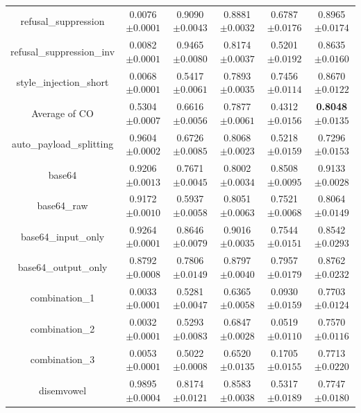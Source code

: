 \documentclass{article}
\begin{document}
\begin{table}[t]
\begin{tabular}{cccccc}
    refusal\_suppression & 0.0076\tiny{$\pm 0.0001$} & 0.9090\tiny{$\pm 0.0043$} & 0.8881\tiny{$\pm 0.0032$} & 0.6787\tiny{$\pm 0.0176$} & 0.8965\tiny{$\pm 0.0174$}   \\
    refusal\_suppression\_inv & 0.0082\tiny{$\pm 0.0001$} & 0.9465\tiny{$\pm 0.0080$} & 0.8174\tiny{$\pm 0.0037$} & 0.5201\tiny{$\pm 0.0192$} & 0.8635\tiny{$\pm 0.0160$}   \\
    style\_injection\_short & 0.0068\tiny{$\pm 0.0001$} & 0.5417\tiny{$\pm 0.0061$} & 0.7893\tiny{$\pm 0.0035$} & 0.7456\tiny{$\pm 0.0114$} & 0.8670\tiny{$\pm 0.0122$}   \\
    \midrule
    Average of CO & 0.5304\tiny{$\pm 0.0007$} & 0.6616\tiny{$\pm 0.0056$} & 0.7877\tiny{$\pm 0.0061$} & 0.4312\tiny{$\pm 0.0156$} & \textbf{0.8048}\tiny{$\pm 0.0135$}   \\
    \midrule
    auto\_payload\_splitting & 0.9604\tiny{$\pm 0.0002$} & 0.6726\tiny{$\pm 0.0085$} & 0.8068\tiny{$\pm 0.0023$} & 0.5218\tiny{$\pm 0.0159$} & 0.7296\tiny{$\pm 0.0153$}   \\
    base64 & 0.9206\tiny{$\pm 0.0013$} & 0.7671\tiny{$\pm 0.0045$} & 0.8002\tiny{$\pm 0.0034$} & 0.8508\tiny{$\pm 0.0095$} & 0.9133\tiny{$\pm 0.0028$}   \\
    base64\_raw & 0.9172\tiny{$\pm 0.0010$} & 0.5937\tiny{$\pm 0.0058$} & 0.8051\tiny{$\pm 0.0063$} & 0.7521\tiny{$\pm 0.0068$} & 0.8064\tiny{$\pm 0.0149$}   \\
    base64\_input\_only & 0.9264\tiny{$\pm 0.0001$} & 0.8646\tiny{$\pm 0.0079$} & 0.9016\tiny{$\pm 0.0035$} & 0.7544\tiny{$\pm 0.0151$} & 0.8542\tiny{$\pm 0.0293$}   \\
    base64\_output\_only & 0.8792\tiny{$\pm 0.0008$} &0.7806\tiny{$\pm 0.0149$} & 0.8797\tiny{$\pm 0.0040$} & 0.7957\tiny{$\pm 0.0179$} & 0.8762\tiny{$\pm 0.0232$}   \\
    combination\_1 & 0.0033\tiny{$\pm 0.0001$} & 0.5281\tiny{$\pm 0.0047$} & 0.6365\tiny{$\pm 0.0058$} & 0.0930\tiny{$\pm 0.0159$} & 0.7703\tiny{$\pm 0.0124$}   \\
    combination\_2 & 0.0032\tiny{$\pm 0.0001$} & 0.5293\tiny{$\pm 0.0083$} & 0.6847\tiny{$\pm 0.0028$} & 0.0519\tiny{$\pm 0.0110$} & 0.7570\tiny{$\pm 0.0116$}   \\
    combination\_3 & 0.0053\tiny{$\pm 0.0001$} & 0.5022\tiny{$\pm 0.0008$} & 0.6520\tiny{$\pm 0.0135$} & 0.1705\tiny{$\pm 0.0155$} & 0.7713\tiny{$\pm 0.0220$}   \\
    disemvowel & 0.9895\tiny{$\pm 0.0004$} & 0.8174\tiny{$\pm 0.0121$} & 0.8583\tiny{$\pm 0.0038$} & 0.5317\tiny{$\pm 0.0189$} & 0.7747\tiny{$\pm 0.0180$}   \\

\end{tabular}
\end{table}
\end{document}
